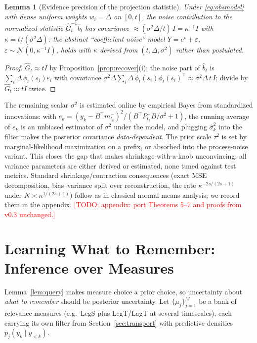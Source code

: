 \documentclass[11pt]{article}
\newtheorem{lemma}{Lemma}
\newcommand{\N}{\mathcal{N}}
\newcommand{\Gh}{\widehat{G}}
\newcommand{\bh}{\widehat{b}}
\newcommand{\TODO}[1]{\textcolor{red}{[TODO: #1]}}
\begin{document}
\begin{lemma}[Evidence precision of the projection statistic]
Under \eqref{eq:obsmodel} with dense uniform weights $w_i=\Delta$ on $[0,t]$, the noise contribution to the normalized statistic $\Gh_t^{-1}\bh_t$ has covariance $\approx(\sigma^2\Delta/t)\,I=\kappa^{-1}I$ with $\kappa=t/(\sigma^2\Delta)$: the abstract ``coefficient noise'' model $Y=c^\star+\varepsilon$, $\varepsilon\sim\N(0,\kappa^{-1}I)$, holds with $\kappa$ \emph{derived} from $(t,\Delta,\sigma^2)$ rather than postulated.
\end{lemma}
\begin{proof}
$\Gh_t\approx tI$ by Proposition~\ref{prop:recover}(i); the noise part of $\bh_t$ is $\sum_i\Delta\,\phi_t(s_i)\varepsilon_i$ with covariance $\sigma^2\Delta\sum_i\Delta\,\phi_t(s_i)\phi_t(s_i)^\top\approx\sigma^2\Delta\,t\,I$; divide by $\Gh_t\approx tI$ twice.
\end{proof}

The remaining scalar $\sigma^2$ is estimated online by empirical Bayes from standardized innovations: with $e_k=(y_k-B^\top m^-_{t_k})^2/(B^\top P^-_{t_k}B/\sigma^2+1)$, the running average of $e_k$ is an unbiased estimator of $\sigma^2$ under the model, and plugging $\widehat\sigma^2_k$ into the filter makes the posterior covariance \emph{data-dependent}. The prior scale $\tau^2$ is set by marginal-likelihood maximization on a prefix, or absorbed into the process-noise variant. This closes the gap that makes shrinkage-with-a-knob unconvincing: all variance parameters are either derived or estimated, none tuned against test metrics. Standard shrinkage/contraction consequences (exact MSE decomposition, bias--variance split over reconstruction, the rate $\kappa^{-2s/(2s+1)}$ under $N\asymp\kappa^{1/(2s+1)}$) follow as in classical normal-means analysis; we record them in the appendix. \TODO{appendix: port Theorems 5--7 and proofs from v0.3 unchanged.}

\section{Learning What to Remember: Inference over Measures}\label{sec:measures}

Lemma~\ref{lem:query} makes measure choice a prior choice, so uncertainty about \emph{what to remember} should be posterior uncertainty. Let $\{\mu_j\}_{j=1}^M$ be a bank of relevance measures (e.g.\ LegS plus LegT/LagT at several timescales), each carrying its own filter from Section~\ref{sec:transport} with predictive densities $p_j(y_k\mid y_{<k})$.
\end{document}
